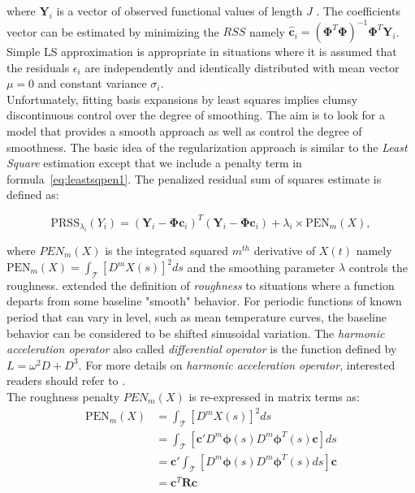 where $\mathbf{Y}_i$ is a vector of observed functional values of length $J$ . The coefficients vector can be estimated by minimizing the $RSS$ namely $\bm{\hat{c}}_i=\left(\bm{\Phi}^T \bm{\Phi}\right)^{-1}\bm{\Phi}^T \bm{Y}_i$. Simple LS approximation is appropriate in situations where it is assumed that the residuals $\epsilon_{i}$ are independently and identically distributed with mean vector $\mu = 0$ and constant variance $\sigma_i$.\\
Unfortunately, fitting basis expansions by least squares implies clumsy discontinuous control over the degree of smoothing. The aim is to look for a model that provides a smooth approach as well as control the degree of smoothness. The basic idea of the regularization approach is similar to the \textit{Least Square} estimation except that we include a penalty term in formula~\eqref{eq:leastsqpen1}. The penalized residual sum of squares estimate is defined as:

\begin{equation}\label{eq:leastsqpen2}
\text{PRSS}_{\lambda_i}(Y_i) =\left(\mathbf{Y}_i-\mathbf{\Phi}\mathbf{c}_i\right)^T\left(\mathbf{Y}_i-\mathbf{\Phi}\mathbf{c}_i\right)+\lambda_i \times \text{PEN}_{m}(X), 
\end{equation}

where $PEN_{m}(X)$ is the integrated squared $m^{th}$ derivative of $X(t)$ namely\\
$\text{PEN}_{m}(X)=\int_{\mathcal{T}} \left[D^{m}X(s)\right]^{2}ds$ and the smoothing parameter $\lambda$ controls the roughness. \cite{Ramsay2009FDA} extended the definition of \textit{roughness} to situations where a function departs from some baseline "smooth" behavior. For periodic functions of known period that can vary in level, such as mean temperature curves, the baseline behavior can be considered to be shifted sinusoidal variation. The \textit{harmonic acceleration operator} also called \textit{differential operator} is the function defined by $L=\omega^2 D + D^3$. For more details on \textit{harmonic acceleration operator}, interested readers should refer to \cite{olberd:ramsay}.\\
The roughness penalty $PEN_{m}(X)$ is re-expressed in matrix terms as:
\begin{align}
    \text{PEN}_{m}(X)&=\int_{\mathcal{T}} \left[D^{m}X(s)\right]^{2} ds \nonumber \\
                    &=\int_{\mathcal{T}} \left[\mathbf{c}'D^{m}\bm{\phi}(s)D^{m}\bm{\phi}^T(s)\mathbf{c}\right]ds \nonumber \\
                    &=\mathbf{c}'\int_{\mathcal{T}} \left[D^{m}\bm{\phi}(s)D^{m}\bm{\phi}^T(s)ds\right]\mathbf{c} \nonumber\\
                    &=\mathbf{c}^T \mathbf{R}\mathbf{c}\label{Rmat1}
    \end{align}

